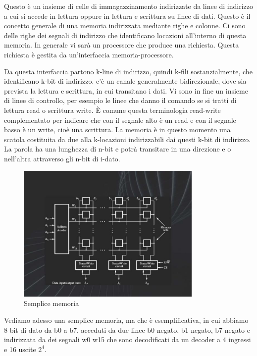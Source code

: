 Questo è un insieme di celle di immagazzinamento indirizzate da linee di indirizzo a cui si accede in lettura oppure in lettura e scrittura su linee di dati.
Questo è il concetto generale di una memoria indirizzata mediante righe e colonne.
Ci sono delle righe dei segnali di indirizzo che identificano locazioni all'interno di questa memoria.
In generale vi sarà un processore che produce una richiesta.
Questa richiesta è gestita da un'interfaccia memoria-processore.

Da questa interfaccia partono k-line di indirizzo, quindi k-fili sostanzialmente, che identificano k-bit di indirizzo.
c'è un canale generalmente bidirezionale, dove sia prevista la lettura e scrittura, in cui transitano i dati.
Vi sono in fine un insieme di linee di controllo, per esempio le linee che danno il comando se si tratti di lettura read o scrittura write.
È comune questa terminologia read-write complementato per indicare che con il segnale alto è un read e con il segnale basso è un write, cioè una scrittura.
La memoria è in questo momento una scatola costituita da due alla k-locazioni indirizzabili dai questi k-bit di indirizzo.
La parola ha una lunghezza di n-bit e potrà transitare in una direzione e o nell'altra attraverso gli n-bit di i-dato.

\FloatBarrier
\begin{figure}[H]
  \centering
  \includegraphics[width=0.80\textwidth,
                    trim=40 40 10 40, %
                    clip]
                    {images/Lez04_p01_fig_05.png}
  \caption{Semplice memoria}
  \label{fig:Lez04_p01_fig_05}
\end{figure}
\FloatBarrier
\noindent

Vediamo adesso una semplice memoria, ma che è esemplificativa, in cui abbiamo 8-bit di dato da b0 a b7, acceduti da due linee b0 negato, b1 negato, b7 negato e indirizzata da dei segnali w0 w15 che sono decodificati da un decoder a 4 ingressi e 16 uscite $2^4$.

